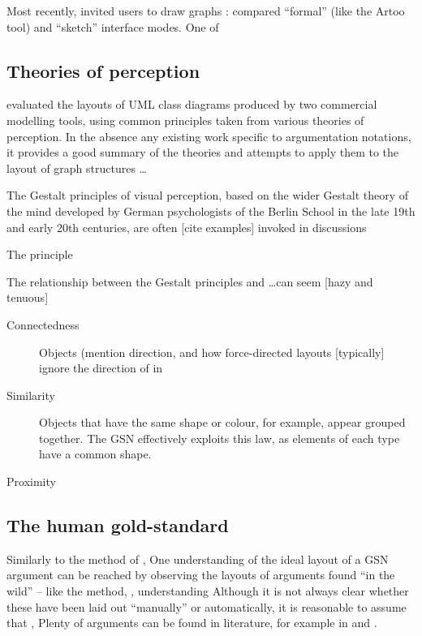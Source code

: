 Most recently, \citet{5674033} invited users to draw graphs :
compared ``formal'' (like the Artoo tool) and ``sketch'' interface modes.
One of

\subsection{Theories of perception}

\citet{kennysun} evaluated the layouts of UML class diagrams produced by two commercial modelling tools, using common principles taken from various theories of perception.
In the absence any existing work specific to argumentation notations, it provides a good summary of the theories and attempts to apply them to the layout of graph structures \ldots


The Gestalt principles of visual perception,
based on the wider Gestalt theory of the mind developed by German psychologists of the Berlin School in the late 19th and early 20th centuries,
are often [cite examples] \citep[136]{storrle} invoked in discussions 

The principle 

The relationship between the Gestalt principles and \ldots can seem [hazy and tenuous]

\begin{description}
    \item[Connectedness] Objects (mention direction, and how force-directed layouts [typically] ignore the direction of in

    \item[Similarity] Objects that have the same shape or colour, for example, appear grouped together.
    The GSN effectively exploits this law, as elements of each type have a common shape.
    
    \item[Proximity]
    
\end{description}



\subsection{The human gold-standard}

Similarly to the method of \citet{5674033}, One understanding of the ideal layout of a GSN argument can be reached by observing the layouts of arguments found ``in the wild'' -- like the method, , understanding 
Although it is not always clear whether these have been laid out ``manually'' or automatically, it is reasonable to assume that , 
Plenty of arguments can be found in literature, for example in \cite{Habli:2006:PPC:1183088.1183090} and  \cite{insilico}.

